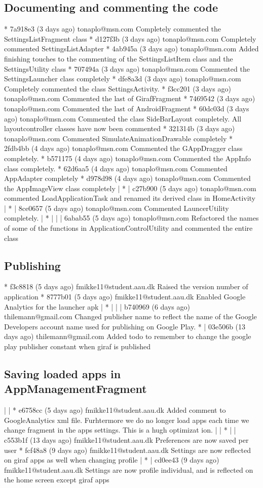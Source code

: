 \subsection{Documenting and commenting the code}
* 7a918e3 (3 days ago) tonaplo@msn.com Completely commented the SettingsListFragment class
* d127f3b (3 days ago) tonaplo@msn.com Completely commented SettingsListAdapter
* 4ab945a (3 days ago) tonaplo@msn.com Added finishing touches to the commenting of the SettingsListItem class and the SettingsUtility class
* 707494a (3 days ago) tonaplo@msn.com Commented the SettingsLauncher class completely
* dfe8a3d (3 days ago) tonaplo@msn.com Completely commented the class SettingsActivity.
* f3cc201 (3 days ago) tonaplo@msn.com Commented the last of GirafFragment
* 7469542 (3 days ago) tonaplo@msn.com Commented the last of AndroidFragment
* 60dc03d (3 days ago) tonaplo@msn.com Commented the class SideBarLayout completely. All layoutcontroller classes have now been commented
* 321314b (3 days ago) tonaplo@msn.com Commented SimulateAnimationDrawable completely
* 2fdb4bb (4 days ago) tonaplo@msn.com Commented the GAppDragger class completely.
* b571175 (4 days ago) tonaplo@msn.com Commented the AppInfo class completely.
* 62d6aa5 (4 days ago) tonaplo@msn.com Commented AppAdapter completely
* d978d98 (4 days ago) tonaplo@msn.com Commented the AppImageView class completely
| * | c27b900 (5 days ago) tonaplo@msn.com commented LoadApplicationTask and renamed its derived class in HomeActivity
| * | 8ce0657 (5 days ago) tonaplo@msn.com Commented LauncerUtility completely.
| * | | | 6abab55 (5 days ago) tonaplo@msn.com Refactored the names of some of the functions in ApplicationControlUtility and commented the entire class

\subsection{Publishing}
* f3c8818 (5 days ago) fmikke11@student.aau.dk Raised the version number of application
* 8777b01 (5 days ago) fmikke11@student.aau.dk Enabled Google Analytics for the launcher apk
| * | | | b740969 (6 days ago) thilemann@gmail.com Changed publisher name to reflect the name of the Google Developers account name used for publishing on Google Play.
* | 03e506b (13 days ago) thilemann@gmail.com Added todo to remember to change the google play publisher constant when giraf is published

\subsection{Saving loaded apps in AppManagementFragment}
| | * e6758cc (5 days ago) fmikke11@student.aau.dk Added comment to GoogleAnalytics xml file. Furhtermore we do no longer load apps each time we change fragment in the apps settings. This is a hugh optimizat
ion.
| | * | | c553b1f (13 days ago) fmikke11@student.aau.dk Preferences are now saved per user
* fcf48a8 (9 days ago) fmikke11@student.aau.dk Settings are now reflected on giraf apps as well when changing profile
| * | cd0ee43 (9 days ago) fmikke11@student.aau.dk Settings are now profile individual, and is reflected on the home screen except giraf apps

